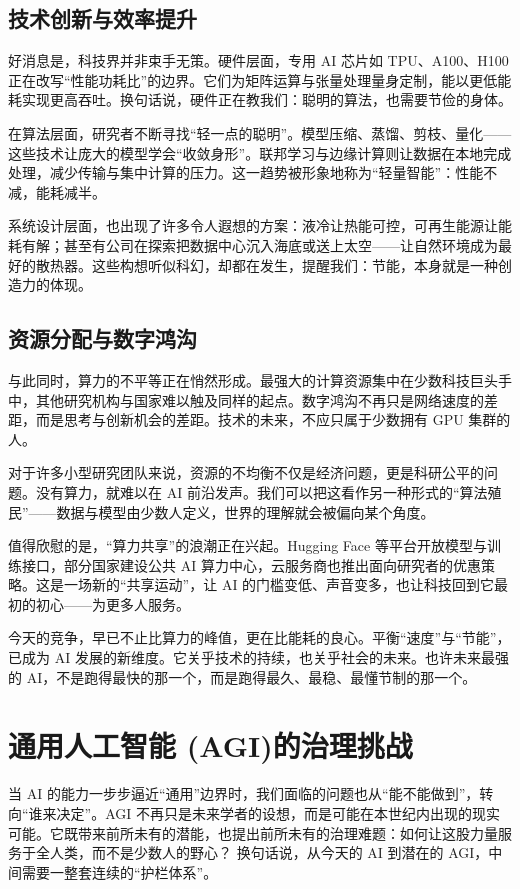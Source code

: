 \subsection{技术创新与效率提升}

好消息是，科技界并非束手无策。硬件层面，专用 AI 芯片如 TPU、A100、H100 正在改写“性能功耗比”的边界。它们为矩阵运算与张量处理量身定制，能以更低能耗实现更高吞吐。换句话说，硬件正在教我们：聪明的算法，也需要节俭的身体。

在算法层面，研究者不断寻找“轻一点的聪明”。模型压缩、蒸馏、剪枝、量化——这些技术让庞大的模型学会“收敛身形”。联邦学习与边缘计算则让数据在本地完成处理，减少传输与集中计算的压力。这一趋势被形象地称为“轻量智能”：性能不减，能耗减半。

系统设计层面，也出现了许多令人遐想的方案：液冷让热能可控，可再生能源让能耗有解；甚至有公司在探索把数据中心沉入海底或送上太空——让自然环境成为最好的散热器。这些构想听似科幻，却都在发生，提醒我们：节能，本身就是一种创造力的体现。

\subsection{资源分配与数字鸿沟}

与此同时，算力的不平等正在悄然形成。最强大的计算资源集中在少数科技巨头手中，其他研究机构与国家难以触及同样的起点。数字鸿沟不再只是网络速度的差距，而是思考与创新机会的差距。技术的未来，不应只属于少数拥有 GPU 集群的人。

对于许多小型研究团队来说，资源的不均衡不仅是经济问题，更是科研公平的问题。没有算力，就难以在 AI 前沿发声。我们可以把这看作另一种形式的“算法殖民”——数据与模型由少数人定义，世界的理解就会被偏向某个角度。

值得欣慰的是，“算力共享”的浪潮正在兴起。Hugging Face 等平台开放模型与训练接口，部分国家建设公共 AI 算力中心，云服务商也推出面向研究者的优惠策略。这是一场新的“共享运动”，让 AI 的门槛变低、声音变多，也让科技回到它最初的初心——为更多人服务。

今天的竞争，早已不止比算力的峰值，更在比能耗的良心。平衡“速度”与“节能”，已成为 AI 发展的新维度。它关乎技术的持续，也关乎社会的未来。也许未来最强的 AI，不是跑得最快的那一个，而是跑得最久、最稳、最懂节制的那一个。

\section{通用人工智能 (AGI)的治理挑战}

当 AI 的能力一步步逼近“通用”边界时，我们面临的问题也从“能不能做到”，转向“谁来决定”。AGI 不再只是未来学者的设想，而是可能在本世纪内出现的现实可能。它既带来前所未有的潜能，也提出前所未有的治理难题：如何让这股力量服务于全人类，而不是少数人的野心？
换句话说，从今天的 AI 到潜在的 AGI，中间需要一整套连续的“护栏体系”。

